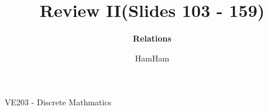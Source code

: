 \documentclass{beamer}
\title{\sffamily Review II(Slides 103 - 159)}
\subtitle{\textbf{Relations }\\}
\institute[UM-SJTU JI]{University of Michigan-Shanghai Jiao Tong University Joint Institute}
\author{HamHam}
\newcommand{\myfont}{\rmfamily\normalsize\upshape\mdseries}
\begin{document}
\begin{titlepage}
    \begin{center}
        VE203 - Discrete Mathmatics 
    \end{center}
\end{titlepage}
\myfont
\end{document}

